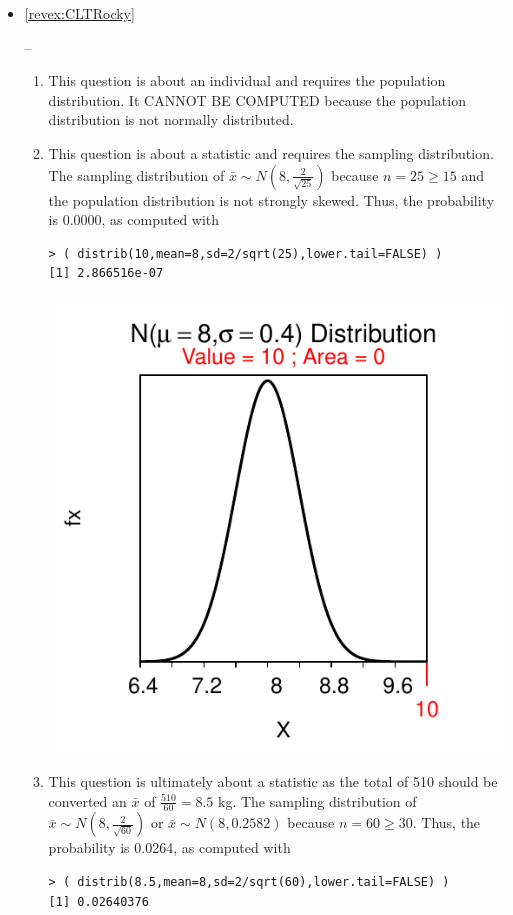 \documentclass[10pt,openany]{book}\usepackage[]{graphicx}\usepackage[]{color}
\makeatletter
\newenvironment{kframe}{%
 \def\at@end@of@kframe{}%
 \ifinner\ifhmode%
  \def\at@end@of@kframe{\end{minipage}}%
  \begin{minipage}{\columnwidth}%
 \fi\fi%
 \def\FrameCommand##1{\hskip\@totalleftmargin \hskip-\fboxsep
 \colorbox{shadecolor}{##1}\hskip-\fboxsep
     \hskip-\linewidth \hskip-\@totalleftmargin \hskip\columnwidth}%
 \MakeFramed {\advance\hsize-\width
   \@totalleftmargin\z@ \linewidth\hsize
   \@setminipage}}%
 {\par\unskip\endMakeFramed%
 \at@end@of@kframe}
\newenvironment{knitrout}{}{} %
\makeatother
\begin{document}
\begin{itemize}
\begin{enumerate}
\begin{knitrout}
\end{knitrout}
    \end{enumerate}
  \item \hypertarget{ans:CLTRocky}{\ref{revex:CLTRocky}} --
    \begin{enumerate}
       \item This question is about an individual and requires the population distribution. It CANNOT BE COMPUTED because the population distribution is not normally distributed.
       \item This question is about a statistic and requires the sampling distribution.  The sampling distribution of  $\bar{x}\sim N(8,\frac{2}{\sqrt{25}})$ because $n=25 \geq 15$ and the population distribution is not strongly skewed.  Thus, the probability is 0.0000, as computed with
\begin{knitrout}
\color{fgcolor}\begin{kframe}
\begin{verbatim}
> ( distrib(10,mean=8,sd=2/sqrt(25),lower.tail=FALSE) )
[1] 2.866516e-07
\end{verbatim}
\end{kframe}

{\centering \includegraphics[width=.4\linewidth]{Figs/unnamed-chunk-307-1} 

}



\end{knitrout}
       \item This question is ultimately about a statistic as the total of 510 should be converted an $\bar{x}$ of $\frac{510}{60}=8.5$ kg.  The sampling distribution of $\bar{x}\sim N(8,\frac{2}{\sqrt{60}})$ or $\bar{x}\sim N(8,0.2582)$ because $n=60 \geq 30$.  Thus, the probability is 0.0264, as computed with
\begin{knitrout}
\color{fgcolor}\begin{kframe}
\begin{verbatim}
> ( distrib(8.5,mean=8,sd=2/sqrt(60),lower.tail=FALSE) )
[1] 0.02640376
\end{verbatim}
\end{kframe}


\end{knitrout}
\end{enumerate}
\end{itemize}
\end{document}
